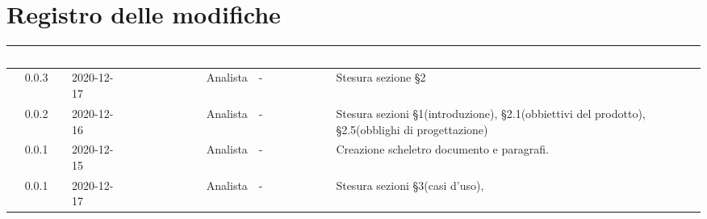 \section*{Registro delle modifiche}
{
\renewcommand{\arraystretch}{1.5}
\centering
\begin{longtable}{c C{2.6cm} C{2.6cm} C{2.6cm} C{2.6cm} C{3.5cm}}
\textcolor{white}{\textbf{Versione}}&
\textcolor{white}{\textbf{Data}}&
\textcolor{white}{\textbf{Nominativo}}&
\textcolor{white}{\textbf{Ruolo}}&
\textcolor{white}{\textbf{Verificatore}}&
\textcolor{white}{\textbf{Descrizione}}\\	
\endhead
	
0.0.3 & 2020-12-17 & \SP{} & Analista & - & Stesura sezione §2\\	
0.0.2 & 2020-12-16 & \SP{} & Analista & - & Stesura sezioni §1(introduzione), §2.1(obbiettivi del prodotto), §2.5(obblighi di progettazione)  \\
0.0.1 & 2020-12-15 & \SP{} & Analista & - & Creazione scheletro documento e paragrafi. \\
0.0.1 & 2020-12-17 & \SH{} & Analista & - & Stesura sezioni §3(casi d'uso),
		
\end{longtable}
}
